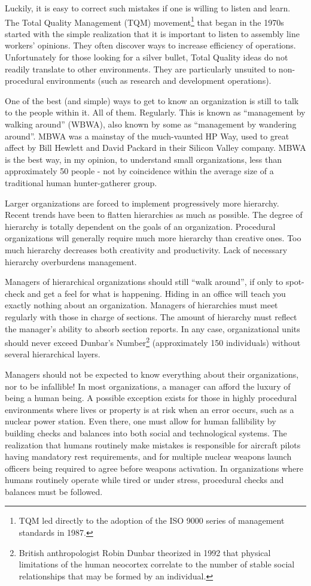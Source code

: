 Luckily, it is easy to correct such mistakes if one is willing to listen and learn.  The Total Quality Management (TQM) movement\footnote{TQM led directly to the adoption of the ISO 9000 series of management standards in 1987.} that began in the 1970s started with the simple realization that it is important to listen to assembly line workers' opinions.  They often discover ways to increase efficiency of operations. Unfortunately for those looking for a silver bullet, Total Quality ideas do not readily translate to other environments. They are particularly unsuited to non-procedural environments (such as research and development operations).

One of the best (and simple) ways to get to know an organization is still to talk to the people within it.  All of them. Regularly.  This is known as ``management by walking around'' (WBWA), also known by some as ``management by wandering around''. MBWA was a mainstay of the much-vaunted HP Way, used to great affect by Bill Hewlett and David Packard in their Silicon Valley company. MBWA is the best way, in my opinion, to understand small organizations, less than approximately 50 people - not by coincidence within the average size of a traditional human hunter-gatherer group.

Larger organizations are forced to implement progressively more hierarchy. Recent trends have been to flatten hierarchies as much as possible.  The degree of hierarchy is totally dependent on the goals of an organization.  Procedural organizations will generally require much more hierarchy than creative ones. Too much hierarchy decreases both creativity and productivity. Lack of necessary hierarchy overburdens management.

Managers of hierarchical organizations should still ``walk around'', if only to spot-check and get a feel for what is happening.  Hiding in an office will teach you exactly nothing about an organization.  Managers of hierarchies must meet regularly with those in charge of sections.  The amount of hierarchy must reflect the manager's ability to absorb section reports. In any case, organizational units should never exceed Dunbar's Number\footnote{British anthropologist Robin Dunbar theorized in 1992 that physical limitations of the human neocortex correlate to the number of stable social relationships that may be formed by an individual.} (approximately 150 individuals) without several hierarchical layers.

Managers should not be expected to know everything about their organizations, nor to be infallible!  In most organizations, a manager can afford the luxury of being a human being.  A possible exception exists for those in highly procedural environments where lives or property is at risk when an error occurs, such as a nuclear power station.  Even there, one must allow for human fallibility by building checks and balances into both social and technological systems.  The realization that humans routinely make mistakes is responsible for aircraft pilots having mandatory rest requirements, and for multiple nuclear weapons launch officers being required to agree before weapons activation.  In organizations where humans routinely operate while tired or under stress, procedural checks and balances must be followed.


